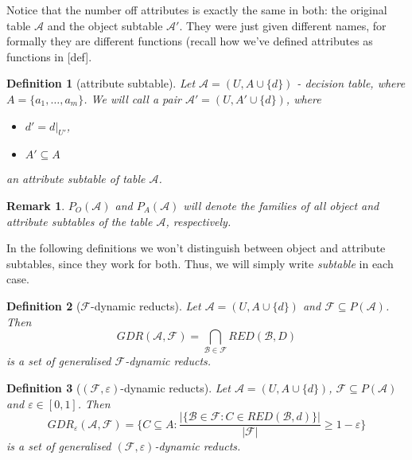\documentclass[12pt]{pracamgr}
\newtheorem{definition}{Definition}[chapter]
\newtheorem{remark}{Remark}[chapter]
\begin{document}
Notice that the number off attributes is exactly the same in both: the original table $\mathcal{A}$ and the object subtable $\mathcal{A'}$. They were just given different names, 
for formally they are different functions (recall how we've defined attributes as functions
in [def].

\begin{definition}[attribute subtable]

  Let $\mathcal{A} = (U, A \cup \{d\})$ - decision table, where $A = \{a_1, \dots, a_m\}$. 
  We will call a pair $\mathcal{A'}  = (U, A' \cup \{d\})$, where 
  \begin{itemize}
    \item $d' = d |_{U'}$,
    \item $A' \subseteq A$
  \end{itemize}
  an \emph{attribute subtable} of table $\mathcal{A}$.
  
\end{definition}

\begin{remark}

  $P_O(\mathcal{A})$ and $P_A(\mathcal{A})$ will denote the families of all object and
  attribute subtables of the table $\mathcal{A}$, respectively.

\end{remark}

In the following definitions we won't distinguish between object and attribute subtables,
since they work for both. Thus, we will simply write \emph{subtable} in each case.

\begin{definition}[$\mathcal{F}$-dynamic reducts]

  Let $\mathcal{A} = (U, A \cup \{d\})$ and $\mathcal{F} \subseteq P(\mathcal{A})$. Then
  $$
  GDR(\mathcal{A},\mathcal{F}) = \bigcap_{\mathcal{B} \in \mathcal{F}} RED(\mathcal{B}, D)
  $$
  is a set of \emph{generalised $\mathcal{F}$-dynamic reducts}.
  
\end{definition}

\begin{definition}[$(\mathcal{F},\varepsilon)$-dynamic reducts]

  Let $\mathcal{A} = (U, A \cup \{d\})$, $\mathcal{F} \subseteq P(\mathcal{A})$ and
  $\varepsilon \in [0, 1]$. Then
  $$
  GDR_\varepsilon(\mathcal{A},\mathcal{F}) = \{C \subseteq A :
  \frac{|\{\mathcal{B} \in \mathcal{F} : C \in RED(\mathcal{B}, d)\}|}{|\mathcal{F}|} \geq 
  1 - \varepsilon \}
  $$
  is a set of \emph{generalised $(\mathcal{F},\varepsilon)$-dynamic reducts}.
  
\end{definition}
\end{document}
